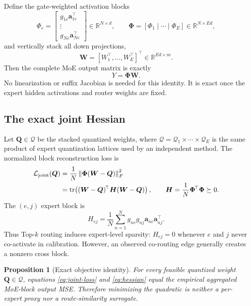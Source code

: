 \documentclass[11pt]{article}
\theoremstyle{plain}
\newtheorem{proposition}{Proposition}
\theoremstyle{definition}
\theoremstyle{remark}
\newcommand{\R}{\mathbb{R}}
\newcommand{\W}{\bm W}
\newcommand{\Q}{\bm Q}
\newcommand{\Hess}{\bm H}
\newcommand{\PhiM}{\bm\Phi}
\newcommand{\calQ}{\mathcal Q}
\newcommand{\tr}{\operatorname{tr}}
\newcommand{\norm}[1]{\left\lVert#1\right\rVert}
\begin{document}
Define the gate-weighted activation blocks
\begin{equation}
  \Phi_e=
  \begin{bmatrix}
  g_{1e}\bm a_{1e}^{\!\top}\\[-1mm]
  \vdots\\[-1mm]
  g_{Ne}\bm a_{Ne}^{\!\top}
  \end{bmatrix}\in\R^{N\times d},
  \qquad
  \PhiM=[\Phi_1\mid\cdots\mid\Phi_E]\in\R^{N\times Ed},
\end{equation}
and vertically stack all down projections,
\begin{equation}
  \W=[W_1^{\!\top},\ldots,W_E^{\!\top}]^{\!\top}\in\R^{Ed\times m}.
\end{equation}
Then the complete MoE output matrix is exactly
\begin{equation}\label{eq:one-linear}
  Y=\PhiM\W.
\end{equation}
No linearization or suffix Jacobian is needed for this identity.  It is exact once the expert hidden activations and router weights are fixed.

\subsection{The exact joint Hessian}

Let $\Q\in\calQ$ be the stacked quantized weights, where $\calQ=\calQ_1\times\cdots\times\calQ_E$ is the same product of expert quantization lattices used by an independent method.  The normalized block reconstruction loss is
\begin{align}
  \mathcal L_{\rm joint}(\Q)
  &=\frac{1}{N}\norm{\PhiM(\W-\Q)}_F^2 \label{eq:joint-loss}\\
  &=\tr\!\left((\W-\Q)^{\!\top}\Hess(\W-\Q)\right),
  \qquad
  \Hess=\frac{1}{N}\PhiM^{\!\top}\PhiM\succeq0.\label{eq:hessian}
\end{align}
The $(e,j)$ expert block is
\begin{equation}\label{eq:cross-block}
  H_{ej}=\frac{1}{N}\sum_{n=1}^{N}g_{ne}g_{nj}\bm a_{ne}\bm a_{nj}^{\!\top}.
\end{equation}
Thus Top-$k$ routing induces expert-level sparsity: $H_{ej}=0$ whenever $e$ and $j$ never co-activate in calibration.  However, an observed co-routing edge generally creates a nonzero cross block.

\begin{proposition}[Exact objective identity]\label{prop:identity}
For every feasible quantized weight $\Q\in\calQ$, equations \eqref{eq:joint-loss} and \eqref{eq:hessian} equal the empirical aggregated MoE-block output MSE.  Therefore minimizing the quadratic is neither a per-expert proxy nor a route-similarity surrogate.
\end{proposition}
\end{document}
